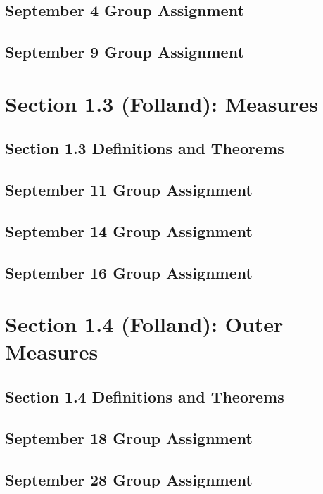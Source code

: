 \documentclass[11pt]{amsart}
\begin{document}
\subsection{September 4 Group Assignment}

\subsection{September 9 Group Assignment}



 \section{Section 1.3 (Folland): Measures}
 \subsection{Section 1.3 Definitions and Theorems}
 
\subsection{September 11 Group Assignment}

\subsection{September 14 Group Assignment}

\subsection{September 16 Group Assignment}


 \section{Section 1.4 (Folland): Outer Measures}
 \subsection{Section 1.4 Definitions and Theorems}
  \clearpage
\subsection{September 18 Group Assignment}


\clearpage


 \subsection{September 28 Group Assignment}

\end{document}
